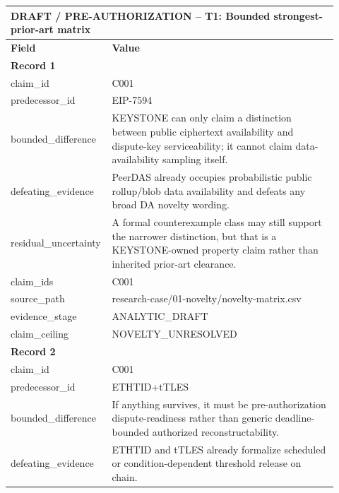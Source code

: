 \providecommand{\KeystoneDraftTableNotice}{\textbf{DRAFT / PRE-AUTHORIZATION}}

\begingroup
\setlength{\tabcolsep}{2pt}
\small\sloppy
\begin{longtable}{|p{0.24\linewidth}|p{0.68\linewidth}|}
\hline
\multicolumn{2}{|l|}{\KeystoneDraftTableNotice{} -- T1: Bounded strongest-prior-art matrix} \\ \hline
\textbf{Field} & \textbf{Value} \\ \hline
\multicolumn{2}{|l|}{\textbf{Record 1}} \\ \hline
claim\_\allowbreak{}id & C001 \\ \hline
predecessor\_\allowbreak{}id & EIP-7594 \\ \hline
bounded\_\allowbreak{}difference & KEYSTONE can only claim a distinction between public ciphertext availability and dispute-key serviceability;\allowbreak{} it cannot claim data-availability sampling itself. \\ \hline
defeating\_\allowbreak{}evidence & PeerDAS already occupies probabilistic public rollup/blob data availability and defeats any broad DA novelty wording. \\ \hline
residual\_\allowbreak{}uncertainty & A formal counterexample class may still support the narrower distinction, but that is a KEYSTONE-owned property claim rather than inherited prior-art clearance. \\ \hline
claim\_\allowbreak{}ids & C001 \\ \hline
source\_\allowbreak{}path & research-case/01-novelty/novelty-matrix.csv \\ \hline
evidence\_\allowbreak{}stage & ANALYTIC\_\allowbreak{}DRAFT \\ \hline
claim\_\allowbreak{}ceiling & NOVELTY\_\allowbreak{}UNRESOLVED \\ \hline
\multicolumn{2}{|l|}{\textbf{Record 2}} \\ \hline
claim\_\allowbreak{}id & C001 \\ \hline
predecessor\_\allowbreak{}id & ETHTID+tTLES \\ \hline
bounded\_\allowbreak{}difference & If anything survives, it must be pre-authorization dispute-readiness rather than generic deadline-bounded authorized reconstructability. \\ \hline
defeating\_\allowbreak{}evidence & ETHTID and tTLES already formalize scheduled or condition-dependent threshold release on chain. \\ \hline

\end{longtable}
